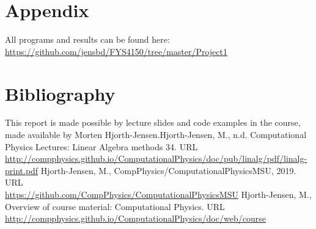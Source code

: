 \documentclass{article}
\begin{document}
\section{Appendix}
All programs and results can be found here:
\url{https://github.com/jensbd/FYS4150/tree/master/Project1}

\section{Bibliography}
This report is made possible by lecture slides and code examples in the course, made available by Morten Hjorth-Jensen.\newline\newline
 [1] Hjorth-Jensen, M., n.d. Computational Physics Lectures: Linear Algebra methods 34. URL \\
 \url{http://compphysics.github.io/ComputationalPhysics/doc/pub/linalg/pdf/linalg-print.pdf}
\newline\newline 
 [2] Hjorth-Jensen, M., CompPhysics/ComputationalPhysicsMSU, 2019. URL\\ \url{https://github.com/CompPhysics/ComputationalPhysicsMSU}
\newline\newline 
 [3] Hjorth-Jensen, M., Overview of course material: Computational Physics. URL \url{http://compphysics.github.io/ComputationalPhysics/doc/web/course}
\end{document}
